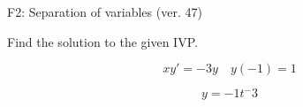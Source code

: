 \begin{exercise}
  \begin{exerciseTitle}F2: Separation of variables (ver. 47)\end{exerciseTitle}
  \begin{exerciseStatement}
    
Find the solution to the given IVP.

    
\[xy'= -3 y \hspace{1em} y( -1 ) = 1\]

  \end{exerciseStatement}
  \begin{exerciseAnswer}
    
\[y= -1 t^ -3\]

  \end{exerciseAnswer}
\end{exercise}
